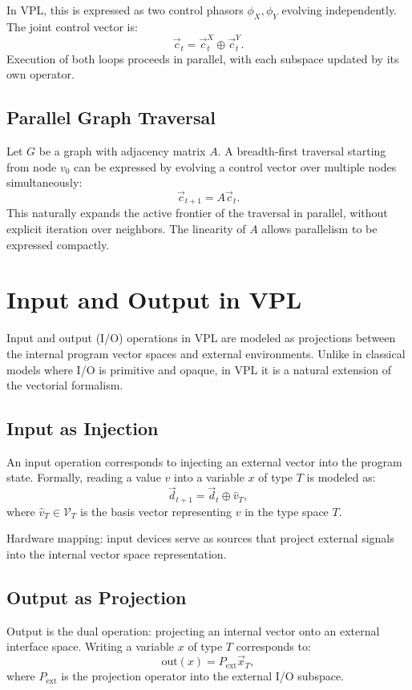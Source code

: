 \documentclass[12pt]{article}
\begin{document}
In VPL, this is expressed as two control phasors $\phi_X, \phi_Y$ evolving
independently. The joint control vector is:
\[
\vec{c}_t = \vec{c}_t^X \oplus \vec{c}_t^Y.
\]
Execution of both loops proceeds in parallel, with each subspace updated by its
own operator.

\subsection{Parallel Graph Traversal}
Let $G$ be a graph with adjacency matrix $A$. A breadth-first traversal starting
from node $v_0$ can be expressed by evolving a control vector over multiple
nodes simultaneously:
\[
\vec{c}_{t+1} = A \vec{c}_t.
\]
This naturally expands the active frontier of the traversal in parallel, without
explicit iteration over neighbors. The linearity of $A$ allows parallelism to be
expressed compactly.

\section{Input and Output in VPL}
Input and output (I/O) operations in VPL are modeled as projections between the
internal program vector spaces and external environments. Unlike in classical
models where I/O is primitive and opaque, in VPL it is a natural extension of
the vectorial formalism.

\subsection{Input as Injection}
An input operation corresponds to injecting an external vector into the program
state. Formally, reading a value $v$ into a variable $x$ of type $T$ is modeled
as:
\[
\vec{d}_{t+1} = \vec{d}_t \oplus \hat{v}_T,
\]
where $\hat{v}_T \in \mathcal{V}_T$ is the basis vector representing $v$ in the
type space $T$.

Hardware mapping: input devices serve as sources that project external signals
into the internal vector space representation.

\subsection{Output as Projection}
Output is the dual operation: projecting an internal vector onto an external
interface space. Writing a variable $x$ of type $T$ corresponds to:
\[
\text{out}(x) = P_{\mathrm{ext}} \vec{x}_T,
\]
where $P_{\mathrm{ext}}$ is the projection operator into the external I/O
subspace.
\end{document}
